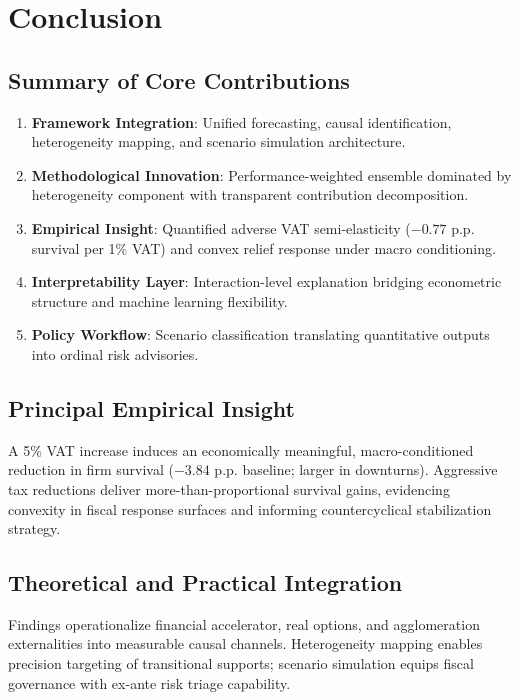 \section{Conclusion}\label{sec:conclusion}

\subsection{Summary of Core Contributions}
\begin{enumerate}
  \item \textbf{Framework Integration}: Unified forecasting, causal identification, heterogeneity mapping, and scenario simulation architecture.
  \item \textbf{Methodological Innovation}: Performance-weighted ensemble dominated by heterogeneity component with transparent contribution decomposition.
  \item \textbf{Empirical Insight}: Quantified adverse VAT semi-elasticity (\(-0.77\) p.p. survival per 1\% VAT) and convex relief response under macro conditioning.
  \item \textbf{Interpretability Layer}: Interaction-level explanation bridging econometric structure and machine learning flexibility.
  \item \textbf{Policy Workflow}: Scenario classification translating quantitative outputs into ordinal risk advisories.
\end{enumerate}

\subsection{Principal Empirical Insight}
A 5\% VAT increase induces an economically meaningful, macro-conditioned reduction in firm survival (\(-3.84\) p.p. baseline; larger in downturns). Aggressive tax reductions deliver more-than-proportional survival gains, evidencing convexity in fiscal response surfaces and informing countercyclical stabilization strategy.

\subsection{Theoretical and Practical Integration}
Findings operationalize financial accelerator, real options, and agglomeration externalities into measurable causal channels. Heterogeneity mapping enables precision targeting of transitional supports; scenario simulation equips fiscal governance with ex-ante risk triage capability.

